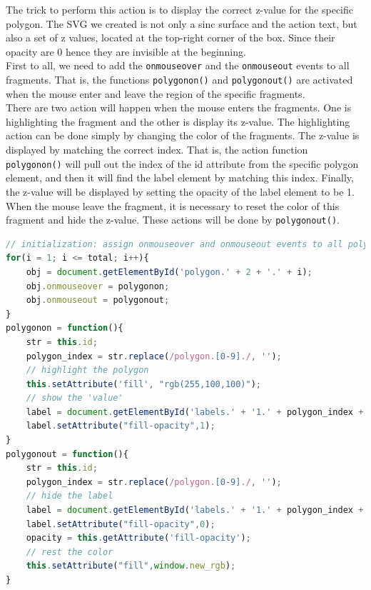 \documentclass[11pt]{report}
\begin{document}
The trick to perform this action is to display the correct z-value for the specific polygon. The SVG we created is not only a sinc surface and the action text, but also a set of z values, located at the top-right corner of the box. Since their opacity are 0 hence they are invisible at the beginning.\\

First to all, we need to add the \texttt{onmouseover} and the \texttt{onmouseout} events to all fragments. That is, the functions \texttt{polygonon()} and \texttt{polygonout()} are activated when the mouse enter and leave the region of the specific fragments.\\

There are two action will happen when the mouse enters the fragments. One is highlighting the fragment and the other is display its z-value. The highlighting action can be done simply by changing the color of the fragments. The z-value is displayed by matching the correct index. That is, the action function \texttt{polygonon()} will pull out the index of the id attribute from the specific polygon element, and then it will find the label element by matching this index. Finally, the z-value will be displayed by setting the opacity of the label element to be 1. When the mouse leave the fragment, it is necessary to reset the color of this fragment and hide the z-value. These actions will be done by \texttt{polygonout()}.\\

\begin{lstlisting}[language = JavaScript]
// initialization: assign onmouseover and onmouseout events to all polygons
for(i = 1; i <= total; i++){
    obj = document.getElementById('polygon.' + 2 + '.' + i);
    obj.onmouseover = polygonon;
    obj.onmouseout = polygonout;
}
polygonon = function(){
    str = this.id;
    polygon_index = str.replace(/polygon.[0-9]./, '');
    // highlight the polygon
    this.setAttribute('fill', "rgb(255,100,100)");
    // show the 'value'
    label = document.getElementById('labels.' + '1.' + polygon_index + '.text');
    label.setAttribute("fill-opacity",1);
}
polygonout = function(){
    str = this.id;
    polygon_index = str.replace(/polygon.[0-9]./, '');
    // hide the label
    label = document.getElementById('labels.' + '1.' + polygon_index + '.text');
    label.setAttribute("fill-opacity",0);
    opacity = this.getAttribute('fill-opacity');
    // rest the color
    this.setAttribute("fill",window.new_rgb);
}
\end{lstlisting}
\end{document}
